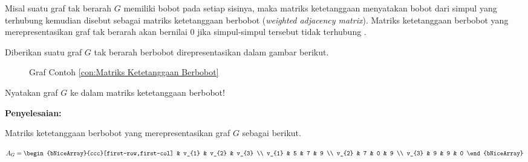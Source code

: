 {{{            Misal suatu graf tak berarah $G$ memiliki bobot pada setiap sisinya, maka matriks ketetanggaan menyatakan bobot dari simpul yang terhubung kemudian
            disebut sebagai matriks ketetanggaan berbobot (\textit{weighted adjacency matrix}). Matriks ketetanggaan berbobot yang merepresentasikan graf tak berarah
            akan bernilai $0$ jika simpul-simpul tersebut tidak terhubung .

            \begin{contoh}
                \label{con:Matriks Ketetanggaan Berbobot}
                Diberikan suatu graf $G$ tak berarah berbobot direpresentasikan dalam gambar berikut.

                \begin{figure}
                    \centering
                    \vspace{0mm}
                    \caption{Graf Contoh \ref{con:Matriks Ketetanggaan Berbobot}}
                    \label{gam:Contoh Matriks ketetanggaan Berbobot}
                \end{figure}

                \noindent
                Nyatakan graf $G$ ke dalam matriks ketetanggaan berbobot!

                \noindent
                \textbf{Penyelesaian:}

                {\noindent
                    Matriks ketetanggaan berbobot yang merepresentasikan graf $G$ sebagai berikut.

                    \begin{equation*}
                        A_{G} =
                        \begin{bNiceArray}{ccc}[first-row,first-col]
                            & v_{1} & v_{2} & v_{3} \\
                            v_{1} & 5 & 7 & 9 \\
                            v_{2} & 7 & 0 & 9 \\
                            v_{3} & 9 & 9 & 0
                        \end{bNiceArray}
                    \end{equation*}

}
\end{contoh}}}}
